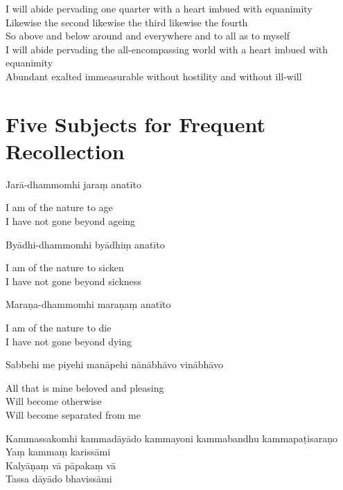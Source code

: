 I will abide pervading one quarter with a heart imbued with equanimity\\
Likewise the second likewise the third likewise the fourth\\
So above and below around and everywhere and to all as to myself\\
I will abide pervading the all-encompassing world with a heart imbued with equanimity\\
Abundant exalted immeasurable without hostility and without ill-will


\clearpage

\section{Five Subjects for Frequent Recollection}

\begin{leader}
\end{leader}

Jarā-dhammomhi jaraṃ anatīto

\begin{english}
  I am of the nature to age\\
  I have not gone beyond ageing
\end{english}

Byādhi-dhammomhi byādhiṃ anatīto

\begin{english}
  I am of the nature to sicken\\
  I have not gone beyond sickness
\end{english}

Maraṇa-dhammomhi maraṇaṃ anatīto

\begin{english}
  I am of the nature to die\\
  I have not gone beyond dying
\end{english}

Sabbehi me piyehi manāpehi nānābhāvo vinābhāvo

\begin{english}
  All that is mine beloved and pleasing\\
  Will become otherwise\\
  Will become separated from me
\end{english}

Kammassakomhi kammadāyādo kammayoni kammabandhu kammapaṭisaraṇo\\
Yaṃ kammaṃ karissāmi\\
Kalyāṇaṃ vā pāpakaṃ vā\\
Tassa dāyādo bhavissāmi

